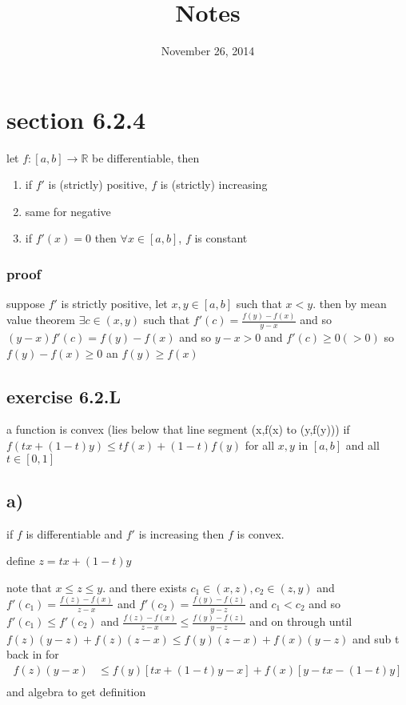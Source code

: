 \documentclass[letterpaper]{article}
\begin{document}
\title{Notes}
\date{November 26, 2014}
\maketitle
\section*{section 6.2.4}
let $f:[a,b]\to\mathbb{R}$ be differentiable, then
\begin{enumerate}
\item
if $f'$ is (strictly) positive, $f$ is (strictly) increasing
\item
same for negative
\item
if $f'(x)=0$ then $\forall x\in[a,b]$, $f$ is constant
\end{enumerate}
\subsubsection*{proof}
suppose $f'$ is strictly positive, let $x,y\in[a,b]$ such that $x<y$. then by mean value theorem $\exists c\in(x,y)$ such that $f'(c)=\frac{f(y)-f(x)}{y-x}$ and so $(y-x)f'(c)=f(y)-f(x)$ and so $y-x>0$ and $f'(c)\ge 0 (>0)$ so $f(y)-f(x)\ge0$ an $f(y)\ge f(x)$

\subsection*{exercise 6.2.L}
a function is convex (lies below that line segment (x,f(x) to (y,f(y))) if $f(tx+(1-t)y)\le tf(x) +(1-t)f(y)$ for all $x,y$ in $[a,b]$ and all $t\in[0,1]$
\subsection*{a)} if $f$ is differentiable and $f'$ is increasing then $f$ is convex.

define $z=tx+(1-t)y$

note that $x\le z\le y$. and there exists $c_1\in(x,z),c_2\in(z,y)$ and $f'(c_1)=\frac{f(z)-f(x)}{z-x}$ and $f'(c_2)=\frac{f(y)-f(z)}{y-z}$ and $c_1< c_2$ and so $f'(c_1)\le f'(c_2)$ and $\frac{f(z)-f(x)}{z-x}\le \frac{f(y)-f(z)}{y-z}$ and on through until $f(z)(y-z)+f(z)(z-x)\le f(y)(z-x)+f(x)(y-z)$ and sub t back in for
\begin{align*}
  f(z)(y-x)&\le f(y)[tx+(1-t)y-x]+f(x)[y-tx-(1-t)y]\\
\end{align*}
and algebra to get definition
\end{document}
